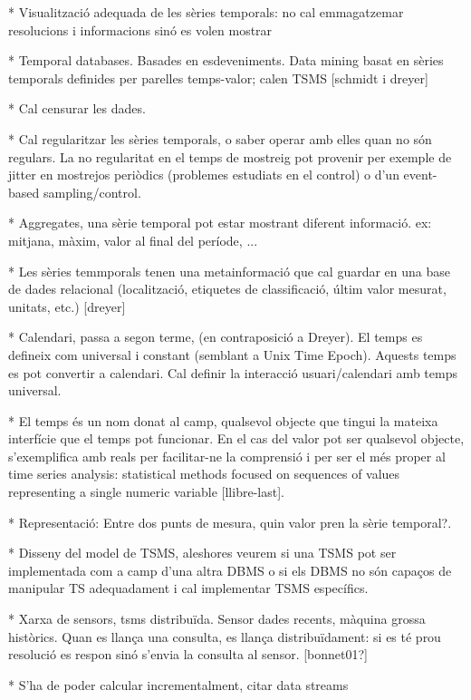 \documentclass{scrartcl}
\begin{document}
* Visualització adequada de les sèries temporals: no cal emmagatzemar resolucions i informacions sinó es volen mostrar


* Temporal databases. Basades en esdeveniments. Data mining basat en sèries temporals definides per parelles temps-valor; calen TSMS [schmidt i dreyer] 



* Cal censurar les dades.

* Cal regularitzar les sèries temporals, o saber operar amb elles quan no són regulars. La no regularitat en el temps de mostreig pot provenir per exemple de jitter en mostrejos periòdics (problemes estudiats en el control) o d'un event-based sampling/control.


* Aggregates, una sèrie temporal pot estar mostrant diferent informació. ex: mitjana, màxim, valor al final del període, ...

* Les sèries temmporals tenen una metainformació que cal guardar en una base de dades relacional (localització, etiquetes de classificació, últim valor mesurat, unitats, etc.) [dreyer]



* Calendari, passa a segon terme, (en contraposició a Dreyer). El temps es defineix com universal i constant (semblant a Unix Time Epoch). Aquests temps es pot convertir a calendari. Cal definir la interacció usuari/calendari amb temps universal.

* El temps és un nom donat al camp, qualsevol objecte que tingui la mateixa interfície que el temps pot funcionar. En el cas del valor pot ser qualsevol objecte, s'exemplifica amb reals per facilitar-ne la comprensió i per ser el més proper al time series analysis: statistical methods focused on sequences of values representing a single numeric variable [llibre-last].




* Representació: Entre dos punts de mesura, quin valor pren la sèrie temporal?.


* Disseny del model de TSMS, aleshores veurem si una TSMS pot ser implementada com a camp d'una altra DBMS o si els DBMS no són capaços de manipular TS adequadament i cal implementar TSMS específics.

* Xarxa de sensors, tsms distribuïda. Sensor dades recents, màquina grossa històrics. Quan es llança una consulta, es llança distribuïdament: si es té prou resolució es respon sinó s'envia la consulta al sensor. [bonnet01?]

* S'ha de poder calcular incrementalment, citar data streams
\end{document}
